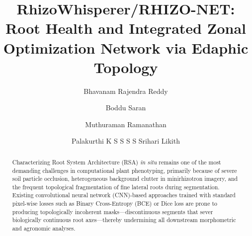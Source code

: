 \documentclass[final,3p,times,nonatbib]{elsarticle}
\begin{document}
\begin{frontmatter}

\title{\textbf{RhizoWhisperer/RHIZO-NET: Root Health and Integrated Zonal Optimization Network via Edaphic Topology}}

\author{Bhavanam Rajendra Reddy}
\author{Boddu Saran}
\author{Muthuraman Ramanathan}
\author{Palakurthi K S S S S Srihari Likith}


\begin{abstract}
Characterizing Root System Architecture (RSA) \textit{in situ} remains one of the most demanding challenges in computational plant phenotyping, primarily because of severe soil particle occlusion, heterogeneous background clutter in minirhizotron imagery, and the frequent topological fragmentation of fine lateral roots during segmentation. Existing convolutional neural network (CNN)-based approaches trained with standard pixel-wise losses such as Binary Cross-Entropy (BCE) or Dice loss are prone to producing topologically incoherent masks---discontinuous segments that sever biologically continuous root axes---thereby undermining all downstream morphometric and agronomic analyses.


\end{abstract}
\end{frontmatter}
\end{document}
